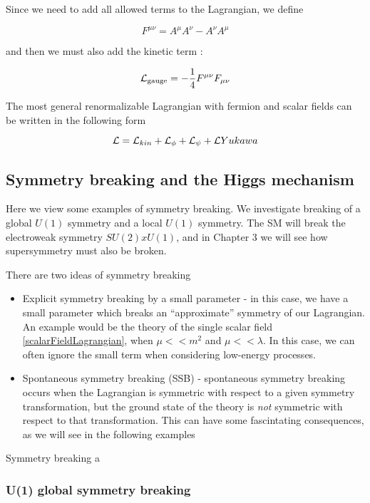 Since we need to add all allowed terms to the Lagrangian, we define

\begin{equation}
F^{\mu\nu} = A^\mu A^\nu - A^\nu A^\mu
\end{equation}

and then we must also add the kinetic term :

\begin{equation}
\mathcal{L}_{\text{gauge}} = - \frac{1}{4} F^{\mu\nu} F_{\mu\nu}
\end{equation}

The most general renormalizable Lagrangian with fermion and scalar fields can be written in the following form

\begin{equation}
\mathcal{L} = \mathcal{L}_{kin} + \mathcal{L}_{\phi} + \mathcal{L}_\psi +   \mathcal{L}{Yukawa}
\end{equation}

\subsection{Symmetry breaking and the Higgs mechanism}

Here we view some examples of symmetry breaking.
We investigate breaking of a global $U(1)$ symmetry and a local $U(1)$ symmetry.
The SM will break the electroweak symmetry $SU(2) x U(1)$, and in Chapter 3 we will see how supersymmetry must also be broken.

There are two ideas of symmetry breaking
\begin{itemize}
\item Explicit symmetry breaking by a small parameter - in this case, we have a small parameter which breaks an ``approximate'' symmetry of our Lagrangian.
An example would be the theory of the single scalar field \ref{scalarFieldLagrangian}, when $\mu << m^2$ and $\mu << \lambda$.
In this case, we can often ignore the small term when considering low-energy processes.
\item Spontaneous symmetry breaking (SSB) - spontaneous symmetry breaking occurs when the Lagrangian is symmetric with respect to a given symmetry transformation, but the ground state of the theory is \textit{not} symmetric with respect to that transformation.
This can have some fascintating consequences, as we will see in the following examples
\end{itemize}
Symmetry breaking a

\subsubsection{U(1) global symmetry breaking}

